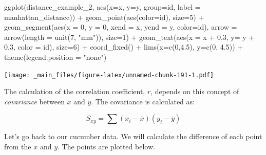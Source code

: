 \documentclass[
]{book}
\newenvironment{Shaded}{\begin{snugshade}}{\end{snugshade}}
\newcommand{\AttributeTok}[1]{\textcolor[rgb]{0.77,0.63,0.00}{#1}}
\newcommand{\DecValTok}[1]{\textcolor[rgb]{0.00,0.00,0.81}{#1}}
\newcommand{\FloatTok}[1]{\textcolor[rgb]{0.00,0.00,0.81}{#1}}
\newcommand{\FunctionTok}[1]{\textcolor[rgb]{0.00,0.00,0.00}{#1}}
\newcommand{\NormalTok}[1]{#1}
\newcommand{\SpecialCharTok}[1]{\textcolor[rgb]{0.00,0.00,0.00}{#1}}
\newcommand{\StringTok}[1]{\textcolor[rgb]{0.31,0.60,0.02}{#1}}
\begin{document}
\begin{Shaded}
\begin{Highlighting}[]
\FunctionTok{ggplot}\NormalTok{(distance\_example\_2, }\FunctionTok{aes}\NormalTok{(}\AttributeTok{x=}\NormalTok{x, }\AttributeTok{y=}\NormalTok{y, }\AttributeTok{group=}\NormalTok{id, }\AttributeTok{label =}\NormalTok{ manhattan\_distance)) }\SpecialCharTok{+}
  \FunctionTok{geom\_point}\NormalTok{(}\FunctionTok{aes}\NormalTok{(}\AttributeTok{color=}\NormalTok{id), }\AttributeTok{size=}\DecValTok{5}\NormalTok{) }\SpecialCharTok{+}
  \FunctionTok{geom\_segment}\NormalTok{(}\FunctionTok{aes}\NormalTok{(}\AttributeTok{x =} \DecValTok{0}\NormalTok{, }\AttributeTok{y =} \DecValTok{0}\NormalTok{, }\AttributeTok{xend =}\NormalTok{ x, }\AttributeTok{yend =}\NormalTok{ y, }\AttributeTok{color=}\NormalTok{id), }\AttributeTok{arrow =} \FunctionTok{arrow}\NormalTok{(}\AttributeTok{length =} \FunctionTok{unit}\NormalTok{(}\DecValTok{7}\NormalTok{, }\StringTok{"mm"}\NormalTok{)), }\AttributeTok{size=}\DecValTok{1}\NormalTok{) }\SpecialCharTok{+}
  \FunctionTok{geom\_text}\NormalTok{(}\FunctionTok{aes}\NormalTok{(}\AttributeTok{x =}\NormalTok{ x }\SpecialCharTok{+} \FloatTok{0.3}\NormalTok{, }\AttributeTok{y=}\NormalTok{ y }\SpecialCharTok{+} \FloatTok{0.3}\NormalTok{, }\AttributeTok{color =}\NormalTok{ id), }\AttributeTok{size=}\DecValTok{6}\NormalTok{) }\SpecialCharTok{+} 
  \FunctionTok{coord\_fixed}\NormalTok{() }\SpecialCharTok{+}
  \FunctionTok{lims}\NormalTok{(}\AttributeTok{x=}\FunctionTok{c}\NormalTok{(}\DecValTok{0}\NormalTok{,}\FloatTok{4.5}\NormalTok{), }\AttributeTok{y=}\FunctionTok{c}\NormalTok{(}\DecValTok{0}\NormalTok{, }\FloatTok{4.5}\NormalTok{)) }\SpecialCharTok{+} 
  \FunctionTok{theme}\NormalTok{(}\AttributeTok{legend.position =} \StringTok{"none"}\NormalTok{)}
\end{Highlighting}
\end{Shaded}

\texttt{[image: \_main\_files/figure-latex/unnamed-chunk-191-1.pdf]}

The calculation of the correlation coefficient, \(r\), depends on this concept of \emph{covariance} between \(x\) and \(y\). The covariance is calculated as:

\[S_{xy} = \sum(x_i - \bar{x})(y_i-\bar{y}) \]

Let's go back to our cucumber data. We will calculate the difference of each point from the \(\bar{x}\) and \(\bar{y}\). The points are plotted below.
\end{document}
